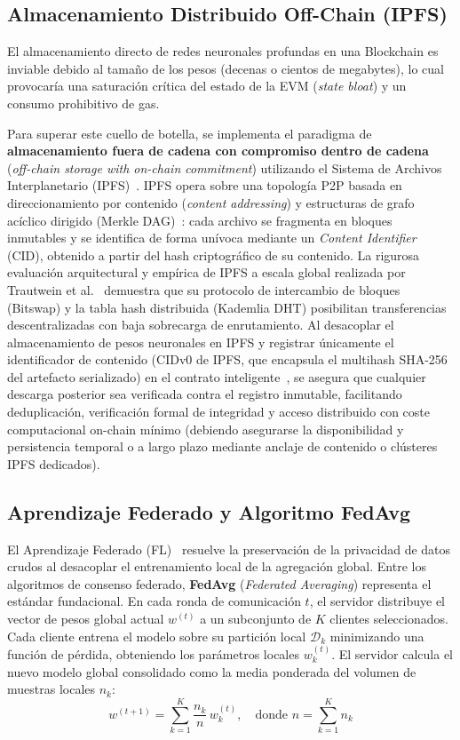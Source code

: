 \subsection{Almacenamiento Distribuido Off-Chain (IPFS)}
El almacenamiento directo de redes neuronales profundas en una Blockchain es inviable debido al tamaño de los pesos (decenas o cientos de megabytes), lo cual provocaría una saturación crítica del estado de la EVM (\textit{state bloat}) y un consumo prohibitivo de gas.

Para superar este cuello de botella, se implementa el paradigma de \textbf{almacenamiento fuera de cadena con compromiso dentro de cadena} (\textit{off-chain storage with on-chain commitment}) utilizando el Sistema de Archivos Interplanetario (IPFS)~\cite{benet2014ipfs, daniel2022ipfs}. IPFS opera sobre una topología P2P basada en direccionamiento por contenido (\textit{content addressing}) y estructuras de grafo acíclico dirigido (Merkle DAG)~\cite{daniel2022ipfs, trautwein2022design}: cada archivo se fragmenta en bloques inmutables y se identifica de forma unívoca mediante un \textit{Content Identifier} (CID), obtenido a partir del hash criptográfico de su contenido. La rigurosa evaluación arquitectural y empírica de IPFS a escala global realizada por Trautwein et al.~\cite{trautwein2022design} demuestra que su protocolo de intercambio de bloques (Bitswap) y la tabla hash distribuida (Kademlia DHT) posibilitan transferencias descentralizadas con baja sobrecarga de enrutamiento. Al desacoplar el almacenamiento de pesos neuronales en IPFS y registrar únicamente el identificador de contenido (CIDv0 de IPFS, que encapsula el multihash SHA-256 del artefacto serializado) en el contrato inteligente~\cite{zhao2021privacy}, se asegura que cualquier descarga posterior sea verificada contra el registro inmutable, facilitando deduplicación, verificación formal de integridad y acceso distribuido con coste computacional on-chain mínimo (debiendo asegurarse la disponibilidad y persistencia temporal o a largo plazo mediante anclaje de contenido o clústeres IPFS dedicados).

\subsection{Aprendizaje Federado y Algoritmo FedAvg}
El Aprendizaje Federado (FL)~\cite{mcmahan2017federated} resuelve la preservación de la privacidad de datos crudos al desacoplar el entrenamiento local de la agregación global. Entre los algoritmos de consenso federado, \textbf{FedAvg} (\textit{Federated Averaging}) representa el estándar fundacional. En cada ronda de comunicación $t$, el servidor distribuye el vector de pesos global actual $w^{(t)}$ a un subconjunto de $K$ clientes seleccionados. Cada cliente entrena el modelo sobre su partición local $\mathcal{D}_k$ minimizando una función de pérdida, obteniendo los parámetros locales $w_k^{(t)}$. El servidor calcula el nuevo modelo global consolidado como la media ponderada del volumen de muestras locales $n_k$:
\begin{equation}
w^{(t+1)} = \sum_{k=1}^{K} \frac{n_k}{n} \, w_k^{(t)}, \quad \text{donde } n = \sum_{k=1}^{K} n_k
\end{equation}

